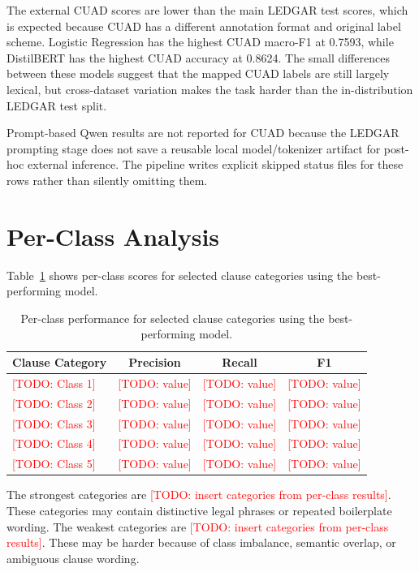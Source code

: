 \documentclass[11pt]{article}
\newcommand{\todo}[1]{\textcolor{red}{[TODO: #1]}}
\begin{document}
The external CUAD scores are lower than the main LEDGAR test scores, which is expected because CUAD has a different annotation format and original label scheme. Logistic Regression has the highest CUAD macro-F1 at 0.7593, while DistilBERT has the highest CUAD accuracy at 0.8624. The small differences between these models suggest that the mapped CUAD labels are still largely lexical, but cross-dataset variation makes the task harder than the in-distribution LEDGAR test split.

Prompt-based Qwen results are not reported for CUAD because the LEDGAR prompting stage does not save a reusable local model/tokenizer artifact for post-hoc external inference. The pipeline writes explicit skipped status files for these rows rather than silently omitting them.

\section{Per-Class Analysis}

Table~\ref{tab:per-class} shows per-class scores for selected clause categories using the best-performing model.

\begin{table}[t]
\centering
\small
\begin{tabular}{lccc}
\toprule
\textbf{Clause Category} & \textbf{Precision} & \textbf{Recall} & \textbf{F1} \\
\midrule
\todo{Class 1} & \todo{value} & \todo{value} & \todo{value} \\
\todo{Class 2} & \todo{value} & \todo{value} & \todo{value} \\
\todo{Class 3} & \todo{value} & \todo{value} & \todo{value} \\
\todo{Class 4} & \todo{value} & \todo{value} & \todo{value} \\
\todo{Class 5} & \todo{value} & \todo{value} & \todo{value} \\
\bottomrule
\end{tabular}
\caption{Per-class performance for selected clause categories using the best-performing model.}
\label{tab:per-class}
\end{table}

The strongest categories are \todo{insert categories from per-class results}. These categories may contain distinctive legal phrases or repeated boilerplate wording. The weakest categories are \todo{insert categories from per-class results}. These may be harder because of class imbalance, semantic overlap, or ambiguous clause wording.
\end{document}

